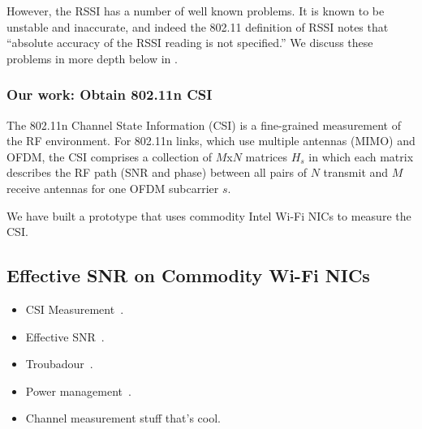 However, the RSSI has a number of well known problems. It is known to be unstable and inaccurate, and indeed the 802.11 definition of RSSI notes that ``absolute accuracy of the RSSI reading is not specified.'' We discuss these problems in more depth below in .

\subsubsection{Our work: Obtain 802.11n CSI}
The 802.11n Channel State Information (CSI) is a fine-grained measurement of the RF environment. For 802.11n links, which use multiple antennas (MIMO) and OFDM, the CSI comprises a collection of $M$x$N$ matrices $H_s$ in which each matrix describes the RF path (SNR and phase) between all pairs of $N$ transmit and $M$ receive antennas for one OFDM subcarrier $s$.

We have built a prototype that uses commodity Intel Wi-Fi NICs to measure the CSI. 

\subsection{Effective SNR on Commodity Wi-Fi NICs}
\label{sec:esnr}

\begin{itemize}
\item CSI Measurement~\cite{halperin_esnr}.
\item Effective SNR~\cite{halperin_esnr}.
\item Troubadour~\cite{halperin_troubadour}.
\item Power management~\cite{halperin_power}.
\item Channel measurement stuff that's cool.
\end{itemize}